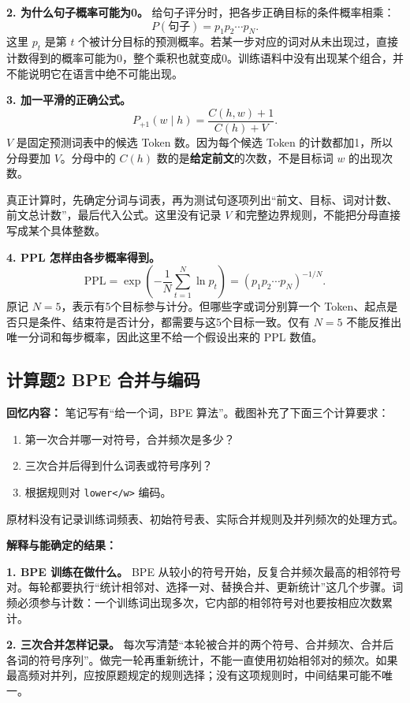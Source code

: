 \documentclass[UTF8,a4paper,zihao=-4,fontset=windows]{ctexart}
\newcommand{\recalled}[1]{\Needspace{8\baselineskip}\subsection*{#1}}
\begin{document}
\textbf{2. 为什么句子概率可能为0。}
给句子评分时，把各步正确目标的条件概率相乘：
\[
P(\text{句子})=p_1p_2\cdots p_N.
\]
这里 $p_t$ 是第 $t$ 个被计分目标的预测概率。若某一步对应的词对从未出现过，直接计数得到的概率可能为0，整个乘积也就变成0。训练语料中没有出现某个组合，并不能说明它在语言中绝不可能出现。

\textbf{3. 加一平滑的正确公式。}
\[
P_{+1}(w\mid h)=\frac{C(h,w)+1}{C(h)+V}.
\]
$V$ 是固定预测词表中的候选 Token 数。因为每个候选 Token 的计数都加1，所以分母要加 $V$。分母中的 $C(h)$ 数的是\textbf{给定前文}的次数，不是目标词 $w$ 的出现次数。

真正计算时，先确定分词与词表，再为测试句逐项列出“前文、目标、词对计数、前文总计数”，最后代入公式。这里没有记录 $V$ 和完整边界规则，不能把分母直接写成某个具体整数。

\textbf{4. PPL 怎样由各步概率得到。}
\[
\mathrm{PPL}=\exp\left(-\frac1N\sum_{t=1}^N\ln p_t\right)
=\left(p_1p_2\cdots p_N\right)^{-1/N}.
\]
原记 $N=5$，表示有5个目标参与计分。但哪些字或词分别算一个 Token、起点是否只是条件、结束符是否计分，都需要与这5个目标一致。仅有 $N=5$ 不能反推出唯一分词和每步概率，因此这里不给一个假设出来的 PPL 数值。

\recalled{计算题2 BPE 合并与编码}

\textbf{回忆内容：}
笔记写有“给一个词，BPE 算法”。截图补充了下面三个计算要求：
\begin{enumerate}[label=(\arabic*)]
\item {}第一次合并哪一对符号，合并频次是多少？
\item {}三次合并后得到什么词表或符号序列？
\item {}根据规则对 \texttt{lower</w>} 编码。
\end{enumerate}
原材料没有记录训练词频表、初始符号表、实际合并规则及并列频次的处理方式。

\textbf{解释与能确定的结果：}

\textbf{1. BPE 训练在做什么。}
BPE 从较小的符号开始，反复合并频次最高的相邻符号对。每轮都要执行“统计相邻对、选择一对、替换合并、更新统计”这几个步骤。词频必须参与计数：一个训练词出现多次，它内部的相邻符号对也要按相应次数累计。

\textbf{2. 三次合并怎样记录。}
每次写清楚“本轮被合并的两个符号、合并频次、合并后各词的符号序列”。做完一轮再重新统计，不能一直使用初始相邻对的频次。如果最高频对并列，应按原题规定的规则选择；没有这项规则时，中间结果可能不唯一。
\end{document}
